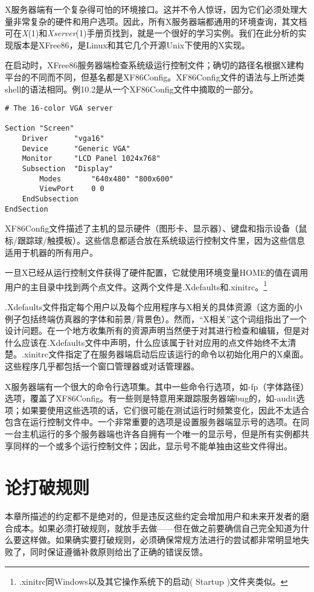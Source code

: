 \documentclass[12pt,oneside]{book}
\begin{document}
\begin{common-format}
X服务器端有一个复杂得可怕的环境接口。这并不令人惊讶，因为它们必须处理大量非常复杂的硬件和用户选项。因此，所有X服务器端都通用的环境查询，其文档可在\textit{X}(1)和\textit{Xserver}(1)手册页找到，就是一个很好的学习实例。我们在此分析的实现版本是XFree86，是Linux和其它几个开源Unix下使用的X实现。

在启动时，XFree86服务器端检查系统级运行控制文件；确切的路径名根据X建构平台的不同而不同，但基名都是XF86Config。XF86Config文件的语法与上所述类shell的语法相同。例10.2是从一个XF86Config文件中摘取的一部分。

\begin{Verbatim}[label=例10.2  X配置示例]
# The 16-color VGA server

Section "Screen"
    Driver      "vga16"
    Device      "Generic VGA"
    Monitor     "LCD Panel 1024x768"
    Subsection  "Display"
        Modes       "640x480" "800x600"
        ViewPort    0 0
    EndSubsection
EndSection
\end{Verbatim}


XF86Config文件描述了主机的显示硬件（图形卡、显示器）、键盘和指示设备（鼠标/跟踪球/触摸板）。这些信息都适合放在系统级运行控制文件里，因为这些信息适用于机器的所有用户。

一旦X已经从运行控制文件获得了硬件配置，它就使用环境变量HOME的值在调用用户的主目录中找到两个点文件。这两个文件是.Xdefaults和.xinitrc。\footnote{.xinitrc同Windows以及其它操作系统下的启动( Startup )文件夹类似。}

.Xdefaults文件指定每个用户以及每个应用程序与X相关的具体资源（这方面的小例子包括终端仿真器的字体和前景/背景色）。然而，“X相关”这个词组指出了一个设计问题。在一个地方收集所有的资源声明当然便于对其进行检查和编辑，但是对什么应该在.Xdefaults文件中声明，什么应该属于针对应用的点文件始终不太清楚。.xinitrc文件指定了在服务器端启动后应该运行的命令以初始化用户的X桌面。这些程序几乎都包括一个窗口管理器或对话管理器。

X服务器端有一个很大的命令行选项集。其中一些命令行选项，如-fp（字体路径）选项，覆盖了XF86Config。有一些则是特意用来跟踪服务器端bug的，如-audit选项；如果要使用这些选项的话，它们很可能在测试运行时频繁变化，因此不太适合包含在运行控制文件中。一个非常重要的选项是设置服务器端显示号的选项。在同一台主机运行的多个服务器端也许各自拥有一个唯一的显示号，但是所有实例都共享同样的一个或多个运行控制文件；因此，显示号不能单独由这些文件得出。

\section{论打破规则}
本章所描述的约定都不是绝对的，但是违反这些约定会增加用户和未来开发者的磨合成本。如果必须打破规则，就放手去做——但在做之前要确信自己完全知道为什么要这样做。如果确实要打破规则，必须确保常规方法进行的尝试都非常明显地失败了，同时保证遵循补救原则给出了正确的错误反馈。





\end{common-format}
\end{document}
